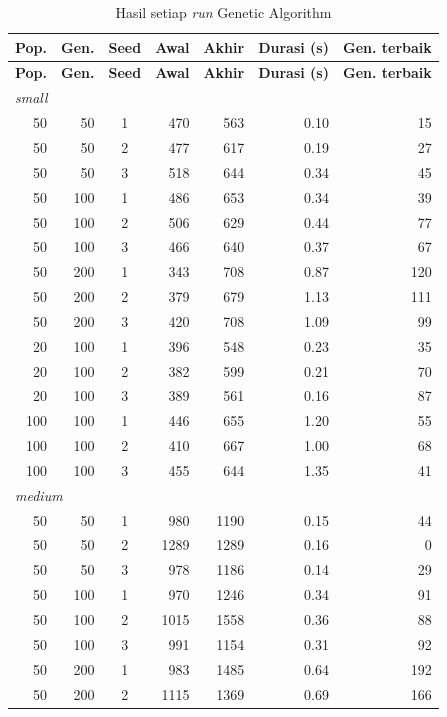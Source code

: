 {\scriptsize\setlength{\tabcolsep}{4pt}
\begin{longtable}{r r c r r r r}
\caption{Hasil setiap \textit{run} Genetic Algorithm}\label{tab:ga-runs}\\
\toprule
\textbf{Pop.} & \textbf{Gen.} & \textbf{Seed} & \textbf{Awal} & \textbf{Akhir} & \textbf{Durasi (s)} & \textbf{Gen. terbaik} \\
\endfirsthead
\toprule
\textbf{Pop.} & \textbf{Gen.} & \textbf{Seed} & \textbf{Awal} & \textbf{Akhir} & \textbf{Durasi (s)} & \textbf{Gen. terbaik} \\
\endhead
\midrule
\multicolumn{7}{l}{\textit{small}} \\
50 & 50 & 1 & 470 & 563 & 0.10 & 15 \\
50 & 50 & 2 & 477 & 617 & 0.19 & 27 \\
50 & 50 & 3 & 518 & 644 & 0.34 & 45 \\
50 & 100 & 1 & 486 & 653 & 0.34 & 39 \\
50 & 100 & 2 & 506 & 629 & 0.44 & 77 \\
50 & 100 & 3 & 466 & 640 & 0.37 & 67 \\
50 & 200 & 1 & 343 & 708 & 0.87 & 120 \\
50 & 200 & 2 & 379 & 679 & 1.13 & 111 \\
50 & 200 & 3 & 420 & 708 & 1.09 & 99 \\
20 & 100 & 1 & 396 & 548 & 0.23 & 35 \\
20 & 100 & 2 & 382 & 599 & 0.21 & 70 \\
20 & 100 & 3 & 389 & 561 & 0.16 & 87 \\
100 & 100 & 1 & 446 & 655 & 1.20 & 55 \\
100 & 100 & 2 & 410 & 667 & 1.00 & 68 \\
100 & 100 & 3 & 455 & 644 & 1.35 & 41 \\
\midrule
\multicolumn{7}{l}{\textit{medium}} \\
50 & 50 & 1 & 980 & 1190 & 0.15 & 44 \\
50 & 50 & 2 & 1289 & 1289 & 0.16 & 0 \\
50 & 50 & 3 & 978 & 1186 & 0.14 & 29 \\
50 & 100 & 1 & 970 & 1246 & 0.34 & 91 \\
50 & 100 & 2 & 1015 & 1558 & 0.36 & 88 \\
50 & 100 & 3 & 991 & 1154 & 0.31 & 92 \\
50 & 200 & 1 & 983 & 1485 & 0.64 & 192 \\
50 & 200 & 2 & 1115 & 1369 & 0.69 & 166 \\

\end{longtable}}
